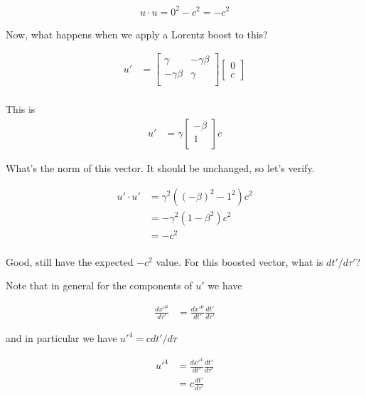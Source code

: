 \documentclass{article}
\begin{document}
\begin{align*}
u \cdot u = 0^2 - c^2 = -c^2
\end{align*}

Now, what happens when we apply a Lorentz boost to this?

\begin{align*}
u' &= 
\begin{bmatrix}
\gamma & - \gamma \beta \\
- \gamma \beta & \gamma \\
\end{bmatrix}
\begin{bmatrix}
0 \\
c
\end{bmatrix} \\
\end{align*}

This is
\begin{align}\label{eqn:uPrime}
u' &= 
\gamma
\begin{bmatrix}
- \beta \\
1 \\
\end{bmatrix}
c
\end{align}

What's the norm of this vector.  It should be unchanged, so let's verify.

\begin{align*}
u' \cdot u' 
&= \gamma^2 \left( (- \beta)^2 - 1^2 \right) c^2 \\
&= - \gamma^2 \left( 1 - \beta^2 \right) c^2 \\
&= - c^2 \\
\end{align*}

Good, still have the expected $-c^2$ value.  For this boosted vector, what is $dt'/d\tau'$?

Note that in general for the components of $u'$ we have

\begin{align*}
\frac{{dx'}^\mu}{d\tau'}
&=
\frac{{dx'}^\mu}{dt'} \frac{{dt'}}{d\tau'}
\end{align*}

and in particular we have ${u'}^4 = c dt'/d\tau$ %

\begin{align*}
{u'}^4
&=
\frac{{dx'}^4}{dt'} \frac{{dt'}}{d\tau'} \\
&= c \frac{{dt'}}{d\tau'} \\
\end{align*}
\end{document}
